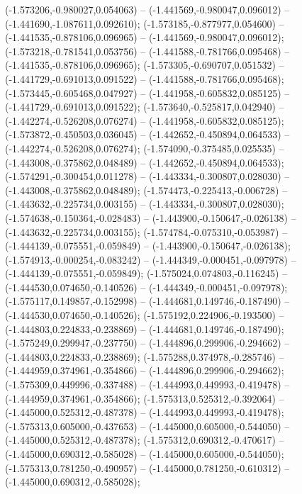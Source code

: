  (-1.573206,-0.980027,0.054063) -- (-1.441569,-0.980047,0.096012) -- (-1.441690,-1.087611,0.092610);
 (-1.573185,-0.877977,0.054600) -- (-1.441535,-0.878106,0.096965) -- (-1.441569,-0.980047,0.096012);
 (-1.573218,-0.781541,0.053756) -- (-1.441588,-0.781766,0.095468) -- (-1.441535,-0.878106,0.096965);
 (-1.573305,-0.690707,0.051532) -- (-1.441729,-0.691013,0.091522) -- (-1.441588,-0.781766,0.095468);
 (-1.573445,-0.605468,0.047927) -- (-1.441958,-0.605832,0.085125) -- (-1.441729,-0.691013,0.091522);
 (-1.573640,-0.525817,0.042940) -- (-1.442274,-0.526208,0.076274) -- (-1.441958,-0.605832,0.085125);
 (-1.573872,-0.450503,0.036045) -- (-1.442652,-0.450894,0.064533) -- (-1.442274,-0.526208,0.076274);
 (-1.574090,-0.375485,0.025535) -- (-1.443008,-0.375862,0.048489) -- (-1.442652,-0.450894,0.064533);
 (-1.574291,-0.300454,0.011278) -- (-1.443334,-0.300807,0.028030) -- (-1.443008,-0.375862,0.048489);
 (-1.574473,-0.225413,-0.006728) -- (-1.443632,-0.225734,0.003155) -- (-1.443334,-0.300807,0.028030);
 (-1.574638,-0.150364,-0.028483) -- (-1.443900,-0.150647,-0.026138) -- (-1.443632,-0.225734,0.003155);
 (-1.574784,-0.075310,-0.053987) -- (-1.444139,-0.075551,-0.059849) -- (-1.443900,-0.150647,-0.026138);
 (-1.574913,-0.000254,-0.083242) -- (-1.444349,-0.000451,-0.097978) -- (-1.444139,-0.075551,-0.059849);
 (-1.575024,0.074803,-0.116245) -- (-1.444530,0.074650,-0.140526) -- (-1.444349,-0.000451,-0.097978);
 (-1.575117,0.149857,-0.152998) -- (-1.444681,0.149746,-0.187490) -- (-1.444530,0.074650,-0.140526);
 (-1.575192,0.224906,-0.193500) -- (-1.444803,0.224833,-0.238869) -- (-1.444681,0.149746,-0.187490);
 (-1.575249,0.299947,-0.237750) -- (-1.444896,0.299906,-0.294662) -- (-1.444803,0.224833,-0.238869);
 (-1.575288,0.374978,-0.285746) -- (-1.444959,0.374961,-0.354866) -- (-1.444896,0.299906,-0.294662);
 (-1.575309,0.449996,-0.337488) -- (-1.444993,0.449993,-0.419478) -- (-1.444959,0.374961,-0.354866);
 (-1.575313,0.525312,-0.392064) -- (-1.445000,0.525312,-0.487378) -- (-1.444993,0.449993,-0.419478);
 (-1.575313,0.605000,-0.437653) -- (-1.445000,0.605000,-0.544050) -- (-1.445000,0.525312,-0.487378);
 (-1.575312,0.690312,-0.470617) -- (-1.445000,0.690312,-0.585028) -- (-1.445000,0.605000,-0.544050);
 (-1.575313,0.781250,-0.490957) -- (-1.445000,0.781250,-0.610312) -- (-1.445000,0.690312,-0.585028);
